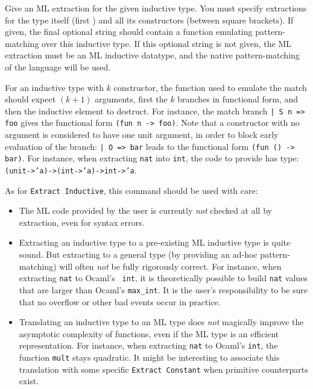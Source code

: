 \begin{description}
\item{}\par
  Give an ML extraction for the given inductive type. You must specify
  extractions for the type itself (first \str) and all its
  constructors (between square brackets). If given, the final optional
  string should contain a function emulating pattern-matching over this
  inductive type. If this optional string is not given, the ML
  extraction must be an ML inductive datatype, and the native
  pattern-matching of the language will be used.
\end{description}

For an inductive type with $k$ constructor, the function used to
emulate the match should expect $(k+1)$ arguments, first the $k$
branches in functional form, and then the inductive element to
destruct. For instance, the match branch \verb$| S n => foo$ gives the
functional form \verb$(fun n -> foo)$. Note that a constructor with no
argument is considered to have one unit argument, in order to block
early evaluation of the branch: \verb$| O => bar$ leads to the functional
form \verb$(fun () -> bar)$. For instance, when extracting {\tt nat}
into {\tt int}, the code to provide has type:
{\tt (unit->'a)->(int->'a)->int->'a}.
    
As for {\tt Extract Inductive}, this command should be used with care:
\begin{itemize}
\item The ML code provided by the user is currently \emph{not} checked at all by
  extraction, even for syntax errors.

\item Extracting an inductive type to a pre-existing ML inductive type
is quite sound. But extracting to a general type (by providing an
ad-hoc pattern-matching) will often \emph{not} be fully rigorously
correct.  For instance, when extracting {\tt nat} to Ocaml's {\tt
int}, it is theoretically possible to build {\tt nat} values that are
larger than Ocaml's {\tt max\_int}. It is the user's responsibility to
be sure that no overflow or other bad events occur in practice.

\item Translating an inductive type to an ML type does \emph{not}
magically improve the asymptotic complexity of functions, even if the
ML type is an efficient representation. For instance, when extracting
{\tt nat} to Ocaml's {\tt int}, the function {\tt mult} stays
quadratic. It might be interesting to associate this translation with
some specific {\tt Extract Constant} when primitive counterparts exist.
\end{itemize}

